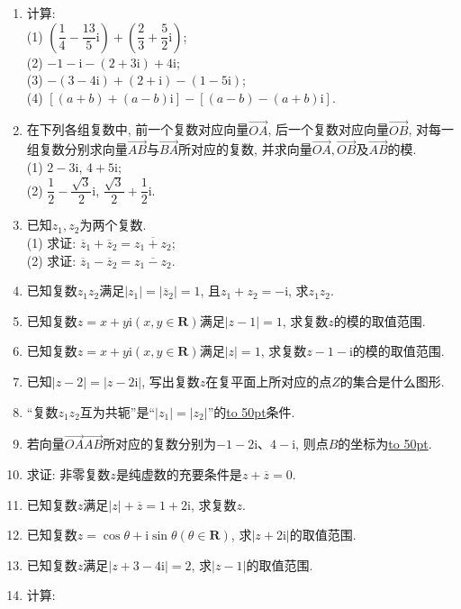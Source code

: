 \documentclass[10pt,a4paper]{article}
\newcommand{\blank}[1]{\underline{\hbox to #1pt{}}}
\begin{document}
\begin{enumerate}[1.]
其中正确命题的序号是\blank{50}.
\item 计算:\\
(1) $(\dfrac 14-\dfrac{13}5\mathrm{i})+(\dfrac 23+\dfrac 52\mathrm{i})$;\\
(2) $-1-\mathrm{i}-(2+3\mathrm{i})+4\mathrm{i}$;\\
(3) $-(3-4\mathrm{i})+(2+\mathrm{i})-(1-5\mathrm{i})$;\\
(4) $[(a+b)+(a-b)\mathrm{i}]-[(a-b)-(a+b)\mathrm{i}]$.
\item 在下列各组复数中, 前一个复数对应向量$\overrightarrow{OA}$, 后一个复数对应向量$\overrightarrow{OB}$, 对每一组复数分别求向量$\overrightarrow{AB}$与$\overrightarrow{BA}$所对应的复数, 并求向量$\overrightarrow{OA},\overrightarrow{OB}$及$\overrightarrow{AB}$的模.\\
(1) $2-3\mathrm{i}$, $4+5\mathrm{i}$;\\ 
(2) $\dfrac 12-\dfrac{\sqrt 3}2\mathrm{i}$, $\dfrac{\sqrt 3}2+\dfrac 12\mathrm{i}$.
\item 已知$z_1,z_2$为两个复数.\\
(1) 求证: $\overline z_1+\overline z_2=\overline {z_1+z_2}$;\\
(2) 求证: $\overline z_1-\overline z_2=\overline {z_1-z_2}$.
\item 已知复数$z_1z_2$满足$|z_1|=|\overline  z_2|=1$, 且$z_1+z_2=-\mathrm{i}$, 求$z_1z_2$.
\item 已知复数$z=x+y\mathrm{i}(x,y\in \mathbf{R})$满足$|z-1|=1$, 求复数$z$的模的取值范围.
\item 已知复数$z=x+y\mathrm{i}(x,y\in \mathbf{R})$满足$|z|=1$, 求复数$z-1-\mathrm{i}$的模的取值范围.
\item 已知$|z-2|=|z-2\mathrm{i}|$, 写出复数$z$在复平面上所对应的点$Z$的集合是什么图形.
\item ``复数$z_1z_2$互为共轭''是``$|z_1|=|z_2|$''的\blank{50}条件.
\item 若向量$\overrightarrow {OA}\overrightarrow {AB}$所对应的复数分别为$-1-2\mathrm{i}$、$4-\mathrm{i}$, 则点$B$的坐标为\blank{50}.
\item 求证: 非零复数$z$是纯虚数的充要条件是$z+\overline  z=0$.
\item 已知复数$z$满足$|z|+\overline z=1+2\mathrm{i}$, 求复数$z$.
\item 已知复数$z=\cos \theta +\mathrm{i}\sin \theta (\theta \in \mathbf{R})$, 求$|z+2\mathrm{i}|$的取值范围.
\item 已知复数$z$满足$|z+3-4\mathrm{i}|=2$, 求$|z-1|$的取值范围.
\item 计算:\\

\end{enumerate}
\end{document}
